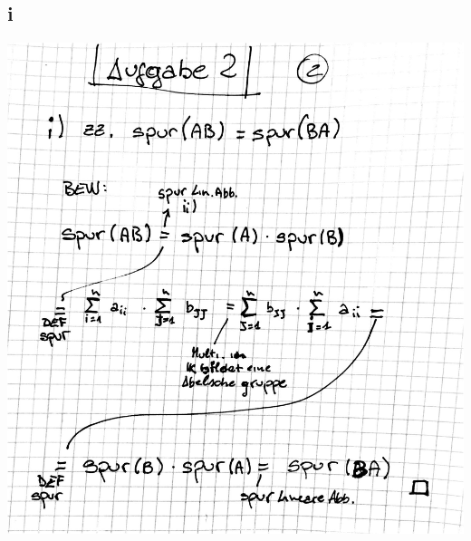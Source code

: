 \documentclass[10pt,a4paper]{article}
\begin{document}
\subsection{i}
\includegraphics[width=\textwidth]{lat5a_2.jpg} 
\end{document}
